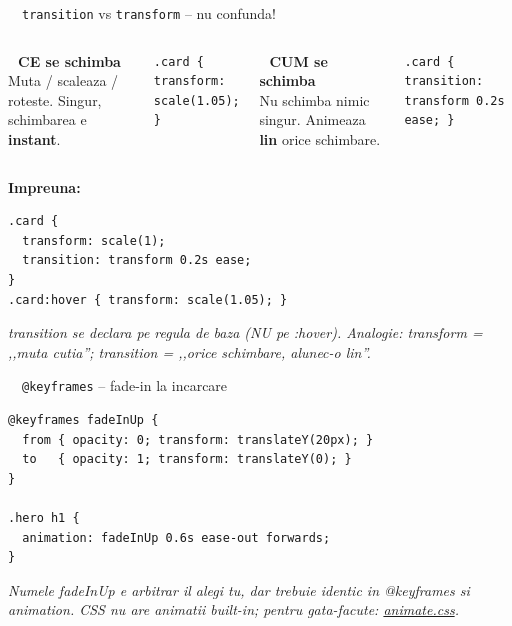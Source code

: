 \documentclass[aspectratio=169,11pt]{beamer}
\newcommand{\code}[1]{{\ttfamily\small\color{accent!85!black}#1}}
\begin{document}
\begin{frame}[fragile]{\textcolor{themeCss}{\faPaintBrush}\ \ \texttt{transition} vs \texttt{transform} -- nu confunda!}
\vspace{4pt}
\begin{columns}[T,onlytextwidth]
  {\bfseries\color{themeCss}\code{transform} \,\textendash\, CE se schimba}\\[4pt]
  {\footnotesize Muta / scaleaza / roteste. Singur, schimbarea e \textbf{instant}.}
\begin{lstlisting}[style=css, basicstyle=\ttfamily\scriptsize, numbers=none]
.card { transform: scale(1.05); }
\end{lstlisting}

  {\bfseries\color{themeCss}\code{transition} \,\textendash\, CUM se schimba}\\[4pt]
  {\footnotesize Nu schimba nimic singur. Animeaza \textbf{lin} orice schimbare.}
\begin{lstlisting}[style=css, basicstyle=\ttfamily\scriptsize, numbers=none]
.card { transition: transform 0.2s ease; }
\end{lstlisting}
\end{columns}

\vspace{6pt}
{\footnotesize\bfseries\color{themeCss}Impreuna:}
\begin{lstlisting}[style=css, basicstyle=\ttfamily\scriptsize, numbers=none]
.card {
  transform: scale(1);
  transition: transform 0.2s ease;
}
.card:hover { transform: scale(1.05); }
\end{lstlisting}

\vspace{4pt}
{\footnotesize\color{textDim}\itshape \code{transition} se declara pe regula de baza (NU pe \code{:hover}). Analogie: \code{transform} = ,,muta cutia''; \code{transition} = ,,orice schimbare, alunec-o lin''.}
\end{frame}

\begin{frame}[fragile]{\textcolor{themeCss}{\faPaintBrush}\ \ \texttt{@keyframes} -- fade-in la incarcare}
\vspace{6pt}
\begin{lstlisting}[style=css]
@keyframes fadeInUp {
  from { opacity: 0; transform: translateY(20px); }
  to   { opacity: 1; transform: translateY(0); }
}

.hero h1 {
  animation: fadeInUp 0.6s ease-out forwards;
}
\end{lstlisting}
\vspace{4pt}
{\footnotesize\color{textDim}\itshape Numele \code{fadeInUp} e arbitrar \textendash{} il alegi tu, dar trebuie identic in \code{@keyframes} si \code{animation}. CSS nu are animatii built-in; pentru gata-facute: \href{https://animate.style}{animate.css}.}
\end{frame}
\end{document}

